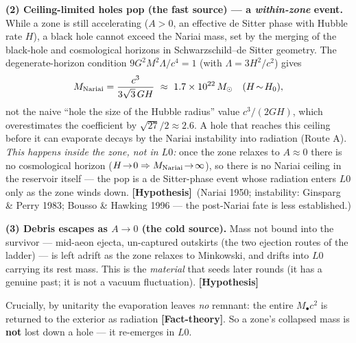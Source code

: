 \documentclass[11pt]{article}
\newcommand{\Hyp}{\textbf{\textcolor{blue!55!black}{[Hypothesis]}}}
\newcommand{\factth}{\textcolor{green!40!black}{\textbf{[Fact-theory]}}}
\newcommand{\msun}{M_\odot}
\newcommand{\Mbh}{M_{\bullet}}
\begin{document}
\textbf{(2) Ceiling-limited holes pop (the fast source) --- a \emph{within-zone} event.} While a zone is still accelerating ($A>0$, an effective de Sitter phase with Hubble rate $H$), a black hole cannot exceed the Nariai mass, set by the merging of the black-hole and cosmological horizons in Schwarzschild--de Sitter geometry. The degenerate-horizon condition $9G^2M^2\Lambda/c^4=1$ (with $\Lambda=3H^2/c^2$) gives
\begin{equation}
M_{\rm Nariai}=\frac{c^3}{3\sqrt3\,G H}\ \approx\ 1.7\times10^{22}\,\msun\quad(H\!\sim\!H_0),
\label{eq:nariai}
\end{equation}
not the naive ``hole the size of the Hubble radius'' value $c^3/(2GH)$, which overestimates the coefficient by $\sqrt{27}/2\!\approx\!2.6$. A hole that reaches this ceiling before it can evaporate decays by the Nariai instability into radiation (Route A). \emph{This happens inside the zone, not in $L0$:} once the zone relaxes to $A\!\approx\!0$ there is no cosmological horizon ($H\!\to\!0\Rightarrow M_{\rm Nariai}\!\to\!\infty$), so there is no Nariai ceiling in the reservoir itself --- the pop is a de Sitter-phase event whose radiation enters $L0$ only as the zone winds down. \Hyp\ (Nariai 1950; instability: Ginsparg \& Perry 1983; Bousso \& Hawking 1996 --- the post-Nariai fate is less established.)

\textbf{(3) Debris escapes as $A\!\to\!0$ (the cold source).} Mass not bound into the survivor --- mid-aeon ejecta, un-captured outskirts (the two ejection routes of the ladder) --- is left adrift as the zone relaxes to Minkowski, and drifts into $L0$ carrying its rest mass. This is the \emph{material} that seeds later rounds (it has a genuine past; it is not a vacuum fluctuation). \Hyp

Crucially, by unitarity the evaporation leaves \emph{no} remnant: the entire $\Mbh c^2$ is returned to the exterior as radiation \factth. So a zone's collapsed mass is \textbf{not} lost down a hole --- it re-emerges in $L0$.


\end{document}
